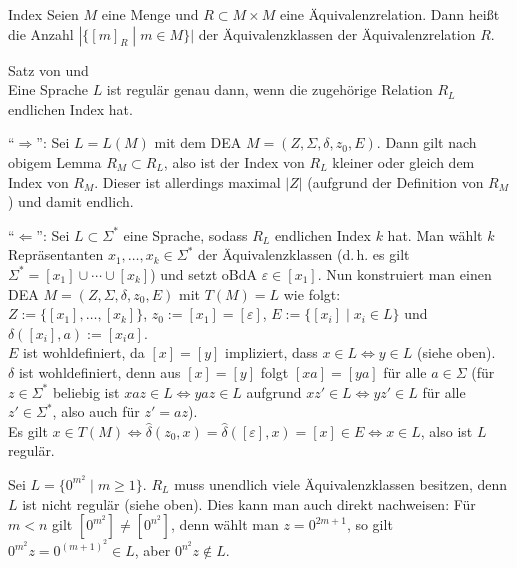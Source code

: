 \linie

\begin{Def}{Index}
    Seien $M$ eine Menge und $R \subset M \times M$ eine Äquivalenzrelation.
    Dann heißt die Anzahl $|\{[m]_R \;|\; m \in M\}|$ der
    Äquivalenzklassen  der Äquivalenzrelation $R$.
\end{Def}

\begin{Satz}{Satz von  und }\\
    Eine Sprache $L$ ist regulär genau dann, wenn
    die zugehörige Relation $R_L$ endlichen Index hat.
\end{Satz}

\begin{Beweis}
    "`$\Rightarrow$"':
    Sei $L = L(M)$ mit dem DEA $M = (Z, \Sigma, \delta, z_0, E)$.
    Dann gilt nach obigem Lemma $R_M \subset R_L$, also ist
    der Index von $R_L$ kleiner oder gleich dem Index von $R_M$.
    Dieser ist allerdings maximal $|Z|$ (aufgrund der Definition von $R_M$)
    und damit endlich.
    
    "`$\Leftarrow$"':
    Sei $L \subset \Sigma^\ast$ eine Sprache, sodass $R_L$ endlichen Index $k$
    hat.
    Man wählt $k$ Repräsentanten $x_1, \dotsc, x_k \in \Sigma^\ast$ der
    Äquivalenzklassen
    (d.\,h. es gilt $\Sigma^\ast = [x_1] \cup \dotsb \cup [x_k]$)
    und setzt oBdA $\varepsilon \in [x_1]$.
    Nun konstruiert man einen DEA $M = (Z, \Sigma, \delta, z_0, E)$ mit
    $T(M) = L$ wie folgt:\\
    $Z := \{[x_1], \dotsc, [x_k]\}$, $z_0 := [x_1] = [\varepsilon]$,
    $E := \{[x_i] \;|\; x_i \in L\}$ und
    $\delta([x_i], a) := [x_i a]$.\\
    $E$ ist wohldefiniert, da $[x] = [y]$ impliziert,
    dass $x \in L \iff y \in L$ (siehe oben).\\
    $\delta$ ist wohldefiniert, denn aus $[x] = [y]$ folgt
    $[xa] = [ya]$ für alle $a \in \Sigma$
    (für $z \in \Sigma^\ast$ beliebig ist
    $xaz \in L \iff yaz \in L$ aufgrund
    $xz' \in L \iff yz' \in L$ für alle $z' \in \Sigma^\ast$,
    also auch für $z' = az$).\\
    Es gilt $x \in T(M)
    \iff \widehat{\delta}(z_0, x) =
    \widehat{\delta}([\varepsilon], x) =
    [x] \in E \iff x \in L$, also ist $L$ regulär.
\end{Beweis}

\linie

\begin{Bsp}
    Sei $L = \{0^{m^2} \;|\; m \ge 1\}$.
    $R_L$ muss unendlich viele Äquivalenzklassen besitzen, denn $L$ ist nicht
    regulär (siehe oben).
    Dies kann man auch direkt nachweisen:
    Für $m < n$ gilt $[0^{m^2}] \not= [0^{n^2}]$, denn
    wählt man $z = 0^{2m + 1}$, so gilt
    $0^{m^2} z = 0^{(m+1)^2} \in L$, aber $0^{n^2} z \notin L$.
\end{Bsp}

